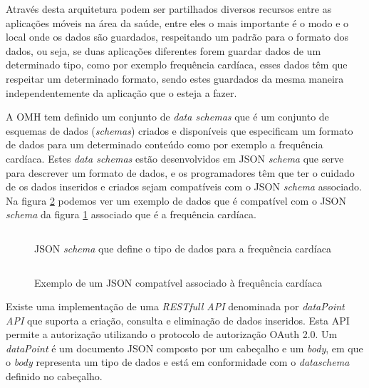 Através desta arquitetura podem ser partilhados diversos recursos entre as aplicações móveis na área da saúde, entre eles o mais importante é o modo e o local onde os dados são guardados, respeitando um padrão para o formato dos dados, ou seja, se duas aplicações diferentes forem guardar dados de um determinado tipo, como por exemplo frequência cardíaca, esses dados têm que respeitar um determinado formato, sendo estes guardados da mesma maneira independentemente da aplicação que o esteja a fazer.
\par 
A \gls{OMH} tem definido um conjunto de \textit{data schemas} que é um conjunto de esquemas de dados (\textit{schemas}) criados e disponíveis que especificam um formato de dados para um determinado conteúdo como por exemplo a frequência cardíaca\cite{omhschemas}. Estes \textit{data schemas} estão desenvolvidos em \gls{JSON} \textit{schema} que serve para descrever um formato de dados, e os programadores têm que ter o cuidado de os dados inseridos e criados sejam  compatíveis com o \gls{JSON} \textit{schema} associado. Na figura \ref{f:exemplo} podemos ver um exemplo de dados que é compatível com o \gls{JSON} \textit{schema} da figura \ref{f:hrjsonschema} associado que é a frequência cardíaca\cite{omhheartrate}.
\newpage

\begin{figure}[H]
\inputminted[fontsize=\scriptsize]{json}{code/hr-jsonschema.json}
\caption[\gls{JSON} \textit{schema} que define o tipo de dados para a frequência cardíaca]{\gls{JSON} \textit{schema} que define o tipo de dados para a frequência cardíaca \cite{omhheartrate}}
\label{f:hrjsonschema}
\end{figure}

\begin{figure}[H]
\inputminted[fontsize=\scriptsize]{json}{code/heart-rate.json}
\caption[Exemplo de um \gls{JSON} compatível associado à frequência cardíaca]{Exemplo de um \gls{JSON} compatível associado à frequência cardíaca \cite{omhheartrate}}
\label{f:exemplo}
\end{figure}
Existe uma implementação de uma \textit{\gls{REST}full \gls{API}} denominada por \textit{dataPoint API} que suporta a criação, consulta e eliminação de dados inseridos. Esta \gls{API} permite a autorização utilizando o protocolo de autorização OAuth 2.0. Um \textit{dataPoint} é um documento \gls{JSON} composto por um cabeçalho e um \textit{body}, em que o \textit{body} representa um tipo de dados e está em conformidade com o \textit{dataschema} definido no cabeçalho.



